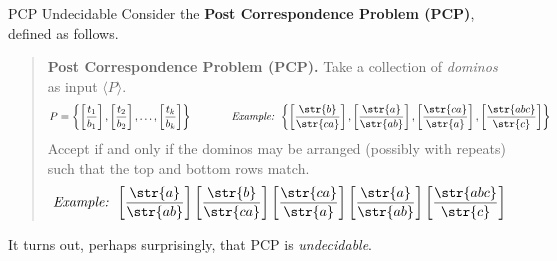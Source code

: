 \begin{theorem}{PCP Undecidable}
    Consider the \textbf{Post Correspondence Problem (PCP)},
    defined as follows.
    \begin{quote}
        \textbf{Post Correspondence Problem (PCP).}
        Take a collection of \emph{dominos} as input $\langle P \rangle$.
        \[
        P = \left\{
            \left[
                \frac{t_1}{b_1}
            \right],
            \left[
                \frac{t_2}{b_2}
            \right],
            \dots,
            \left[
                \frac{t_k}{b_k}
            \right]
        \right\}
        ~~~~~~~~~~~ \textit{Example: }
        \left\{
            \left[
                \frac{\str{b}}{\str{ca}}
            \right],
            \left[
                \frac{\str{a}}{\str{ab}}
            \right],
            \left[
                \frac{\str{ca}}{\str{a}}
            \right],
            \left[
                \frac{\str{abc}}{\str{c}}
            \right]
        \right\}
        \]
        Accept if and only if the dominos may be arranged
        (possibly with repeats) such that
        the top and bottom rows match.
        \[
            \textit{Example: }
            \left[
                \frac{\str{a}}{\str{ab}}
            \right]
            \left[
                \frac{\str{b}}{\str{ca}}
            \right]
            \left[
                \frac{\str{ca}}{\str{a}}
            \right]
            \left[
                \frac{\str{a}}{\str{ab}}
            \right]
            \left[
                \frac{\str{abc}}{\str{c}}
            \right]
        \]
    \end{quote}
    It turns out, perhaps surprisingly, that PCP is \emph{undecidable}.
\end{theorem}



